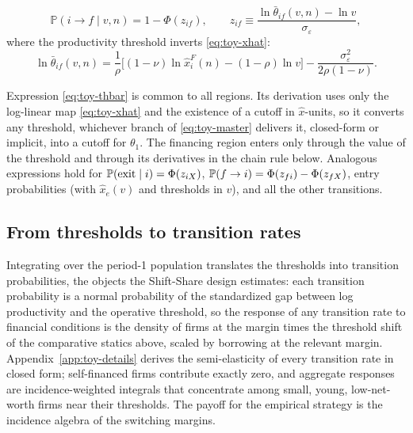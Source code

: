 \documentclass[12pt]{article}
\begin{document}
\begin{equation}
  \mathbb{P}(i\to f \mid v,n)
  = 1-\Phi\!\left(z_{if}\right),
  \qquad
  z_{if} \equiv\frac{\ln\bar{\theta}_{if}(v,n)-\ln v}{\sigma_{\varepsilon}},
  \label{eq:toy-Pif}
\end{equation}
where the productivity threshold inverts \eqref{eq:toy-xhat}:
\begin{equation}
  \ln\bar{\theta}_{if}(v,n)
  = \frac{1}{\rho}\Big[(1-\nu)\ln \hat x^F_{i}(n)
  - (1-\rho)\ln v\Big]
  - \frac{\sigma_{\varepsilon}^{2}}{2\rho(1-\nu)} .
  \label{eq:toy-thbar}
\end{equation}

Expression \eqref{eq:toy-thbar} is common to all regions. Its derivation uses only the log-linear map \eqref{eq:toy-xhat} and the existence of a cutoff in $\hat x$-units, so it converts any threshold, whichever branch of \eqref{eq:toy-master} delivers it, closed-form or implicit, into a cutoff for $\theta_{1}$. The financing region enters only through the value of the threshold and through its derivatives in the chain rule below. Analogous expressions hold for $\mathbb{P}(\text{exit}\mid i)=\Phi(z_{i X})$, $\mathbb{P}(f\to i)=\Phi(z_{fi})-\Phi(z_{f X})$, entry probabilities (with $\hat x_{e}(v)$ and thresholds in $v$), and all the other transitions.

\subsection{From thresholds to transition rates}
\label{sec:toy-transitions}

Integrating over the period-1 population translates the thresholds into transition probabilities, the objects the Shift-Share design estimates: each transition probability is a normal probability of the standardized gap between log productivity and the operative threshold, so the response of any transition rate to financial conditions is the density of firms at the margin times the threshold shift of the comparative statics above, scaled by borrowing at the relevant margin. Appendix~\ref{app:toy-details} derives the semi-elasticity of every transition rate in closed form; self-financed firms contribute exactly zero, and aggregate responses are incidence-weighted integrals that concentrate among small, young, low-net-worth firms near their thresholds. The payoff for the empirical strategy is the incidence algebra of the switching margins.
\end{document}

